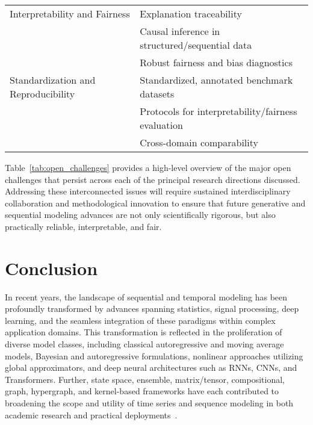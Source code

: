 \documentclass[sigconf]{acmart}
\begin{document}
\begin{table*}[htbp]
\begin{adjustbox}{max width=\textwidth}
\begin{tabular}{>{\raggedright\arraybackslash}p{4.2cm} >{\raggedright\arraybackslash}p{12.8cm}}
\addlinespace
Interpretability and Fairness &
Explanation traceability \\
& Causal inference in structured/sequential data \\
& Robust fairness and bias diagnostics \\
\addlinespace
Standardization and Reproducibility &
Standardized, annotated benchmark datasets \\
& Protocols for interpretability/fairness evaluation \\
& Cross-domain comparability \\
\bottomrule
\end{tabular}
\end{adjustbox}
\end{table*}

Table~\ref{tab:open_challenges} provides a high-level overview of the major open challenges that persist across each of the principal research directions discussed. Addressing these interconnected issues will require sustained interdisciplinary collaboration and methodological innovation to ensure that future generative and sequential modeling advances are not only scientifically rigorous, but also practically reliable, interpretable, and fair.

\section{Conclusion}

In recent years, the landscape of sequential and temporal modeling has been profoundly transformed by advances spanning statistics, signal processing, deep learning, and the seamless integration of these paradigms within complex application domains. This transformation is reflected in the proliferation of diverse model classes, including classical autoregressive and moving average models, Bayesian and autoregressive formulations, nonlinear approaches utilizing global approximators, and deep neural architectures such as RNNs, CNNs, and Transformers. Further, state space, ensemble, matrix/tensor, compositional, graph, hypergraph, and kernel-based frameworks have each contributed to broadening the scope and utility of time series and sequence modeling in both academic research and practical deployments~\cite{ref2,ref7,ref8,ref10,ref11,ref14,ref15,ref16,ref19,ref20,ref24,ref25,ref31,ref32,ref33,ref34,ref35,ref37,ref38,ref39,ref40,ref51,ref55,ref62,ref63,ref64,ref66,ref67,ref73,ref75,ref79,ref83,ref84,ref85,ref86,ref87}.
\end{document}
